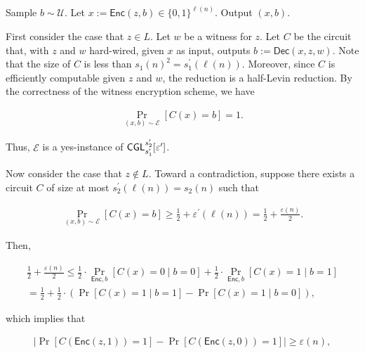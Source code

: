 Sample $b\sim\mathcal{U}$. Let $x:={\mathsf{Enc}}(z,b)\in\{0,1\}^{\ell(n)}$. Output $(x,b)$.\par





First consider the case that $z\in L$. Let $w$ be a witness for $z$. Let $C$ be the circuit that, with $z$ and $w$ hard-wired, given $x$ as input, outputs $b:={\mathsf{Dec}}(x,z,w)$. Note that the size of $C$ is less than $s_{1}(n)^{2}=s^{\prime}_{1}(\ell(n))$. Moreover, since $C$ is efficiently computable given $z$ and $w$, the reduction is a half-Levin reduction. By the correctness of the witness encryption scheme, we have\par


\[\begin{gathered}
\Pr_{(x,b)\sim\mathcal{E}}[C(x)=b]=1.
\end{gathered}\]


Thus, $\mathcal{E}$ is a yes-instance of ${\sf CGL}_{s_{1}^{\prime}}^{s_{2}^{\prime}}[\varepsilon^{\prime}]$.\par




Now consider the case that $z\notin L$. Toward a contradiction, suppose there exists a circuit $C$ of size at most $s_{2}^{\prime}(\ell(n))=s_{2}(n)$ such that\par


\[\begin{gathered}
\Pr_{(x,b)\sim\mathcal{E}}[C(x)=b]\geq\frac{1}{2}+\varepsilon^{\prime}(\ell(n))=\frac{1}{2}+\frac{\varepsilon(n)}{2}.
\end{gathered}\]


Then,\par


\[\begin{gathered}
\displaystyle\frac{1}{2}+\frac{\varepsilon(n)}{2} \displaystyle\leq\frac{1}{2}\cdot\Pr_{{\mathsf{Enc}},b}[C(x)=0\mid b=0]+\frac{1}{2}\cdot\Pr_{{\mathsf{Enc}},b}[C(x)=1\mid b=1] \\
\displaystyle=\frac{1}{2}+\frac{1}{2}\cdot\left(\Pr[C(x)=1\mid b=1]-\Pr[C(x)=1\mid b=0]\right),
\end{gathered}\]


which implies that\par


\[\begin{gathered}
\left|\Pr[C({\mathsf{Enc}}(z,1))=1]-\Pr[C({\mathsf{Enc}}(z,0))=1]\right|\geq\varepsilon({n}),
\end{gathered}\]



